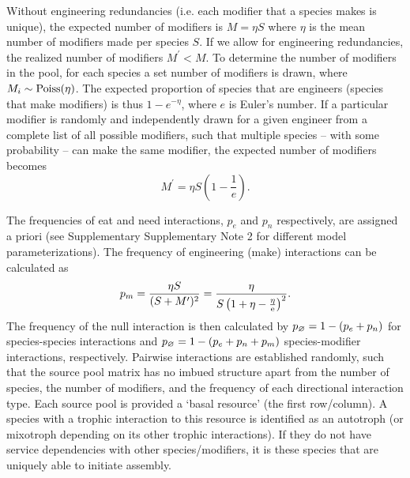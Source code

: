 \documentclass[onecolumn,preprintnumbers,amsmath,amssymb,superscriptaddress]{revtex4-1}
\newcommand{\rr}[1]{{\rm #1}}
\begin{document}
\begin{bibunit}
Without engineering redundancies (i.e. each modifier that a species makes is unique), the expected number of modifiers is $M = \eta S$ where $\eta$ is the mean number of modifiers made per species $S$.
If we allow for engineering redundancies, the realized number of modifiers $M^\prime < M$.
To determine the number of modifiers in the pool, for each species a set number of modifiers is drawn, where $M_i \sim {\rm Poiss}(\eta)$.
The expected proportion of species that are engineers (species that make modifiers) is thus $1-{e}^{-\eta}$, where $e$ is Euler's number.
If a particular modifier is randomly and independently drawn for a given engineer from a complete list of all possible modifiers, such that multiple species -- with some probability -- can make the same modifier, the expected number of modifiers becomes
\begin{equation}
M^\prime = \eta S \left(1 - \frac{1}{{e}}\right).
\label{eq:total}
\end{equation}

The frequencies of eat and need interactions, $p_e$ and $p_n$ respectively, are assigned a priori (see Supplementary Supplementary Note 2 for different model parameterizations).
The frequency of engineering (make) interactions can be calculated as
\begin{equation}
p_m = \frac{\eta S}{(S + M^\prime)^2} = \frac{\eta}{S\left(1 + \eta - \frac{\eta}{\rr{e}}\right)^2}.
\end{equation}
The frequency of the null interaction is then calculated by $p_\rr{\varnothing} = 1 - (p_e + p_n)$ for species-species interactions and $p_\rr{\varnothing} = 1 - (p_e + p_n+ p_m)$ species-modifier interactions, respectively.
Pairwise interactions are established randomly, such that the source pool matrix has no imbued structure apart from the number of species, the number of modifiers, and the frequency of each directional interaction type.
Each source pool is provided a `basal resource' (the first row/column).
A species with a trophic interaction to this resource is identified as an autotroph (or mixotroph depending on its other trophic interactions).
If they do not have service dependencies with other species/modifiers, it is these species that are uniquely able to initiate assembly.


\end{bibunit}
\end{document}
